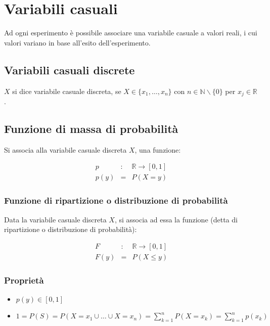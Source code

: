 \documentclass{subfiles}
\begin{document}
\section{Variabili casuali}

Ad ogni esperimento è possibile associare una variabile casuale a valori reali, i cui valori variano in base all'esito dell'esperimento.

\subsection{Variabili casuali discrete}

$X$ si dice variabile casuale discreta, se $X \in \{x_1, \dots, x_n\}$ con $n \in \mathbb{N} \backslash \{0\}$ per $x_j \in \mathbb{R}$.

\subsection{Funzione di massa di probabilità}

Si associa alla variabile casuale discreta $X$, una funzione:

$$
\begin{matrix}
p &:& \mathbb{R} \to [0,1] \\
p(y) &=& P(X = y)
\end{matrix}
$$

\subsubsection{Funzione di ripartizione o distribuzione di probabilità}

Data la variabile casuale discreta $X$, si associa ad essa la funzione (detta di ripartizione o distribuzione di probabilità):

$$
\begin{matrix}
F &:& \mathbb{R} \to [0,1] \\
F(y) &=& P(X \leq y)
\end{matrix}
$$

\subsubsection{Proprietà}

\begin{itemize}
    \item $p(y) \in [0,1]$
    \item $1 = P(S) = P(X = x_1 \cup \dots \cup X = x_n) = \sum^n_{k=1} P(X = x_k) = \sum^n_{k=1} p(x_k)$
\end{itemize}
\end{document}
